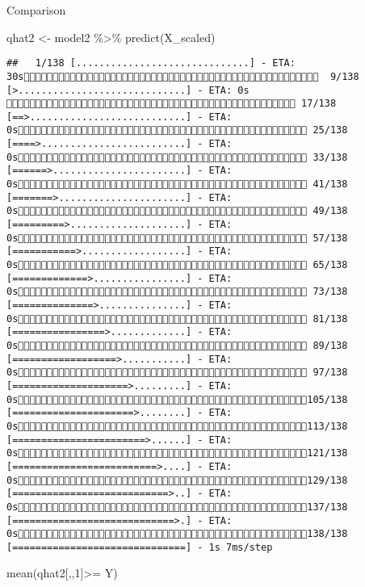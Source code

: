 \documentclass[
  ignorenonframetext,
]{beamer}
\newenvironment{Shaded}{\begin{snugshade}}{\end{snugshade}}
\newcommand{\DecValTok}[1]{\textcolor[rgb]{0.00,0.00,0.81}{#1}}
\newcommand{\FunctionTok}[1]{\textcolor[rgb]{0.00,0.00,0.00}{#1}}
\newcommand{\NormalTok}[1]{#1}
\newcommand{\OtherTok}[1]{\textcolor[rgb]{0.56,0.35,0.01}{#1}}
\newcommand{\SpecialCharTok}[1]{\textcolor[rgb]{0.00,0.00,0.00}{#1}}
\begin{document}
\begin{frame}[fragile]{Comparison}
\protect\hypertarget{comparison}{}
\begin{Shaded}
\begin{Highlighting}[]
\NormalTok{qhat2 }\OtherTok{\textless{}{-}}\NormalTok{ model2 }\SpecialCharTok{\%\textgreater{}\%} \FunctionTok{predict}\NormalTok{(X\_scaled)}
\end{Highlighting}
\end{Shaded}

\begin{verbatim}
##   1/138 [..............................] - ETA: 30s  9/138 [>.............................] - ETA: 0s  17/138 [==>...........................] - ETA: 0s 25/138 [====>.........................] - ETA: 0s 33/138 [======>.......................] - ETA: 0s 41/138 [=======>......................] - ETA: 0s 49/138 [=========>....................] - ETA: 0s 57/138 [===========>..................] - ETA: 0s 65/138 [=============>................] - ETA: 0s 73/138 [==============>...............] - ETA: 0s 81/138 [================>.............] - ETA: 0s 89/138 [==================>...........] - ETA: 0s 97/138 [====================>.........] - ETA: 0s105/138 [=====================>........] - ETA: 0s113/138 [=======================>......] - ETA: 0s121/138 [=========================>....] - ETA: 0s129/138 [===========================>..] - ETA: 0s137/138 [============================>.] - ETA: 0s138/138 [==============================] - 1s 7ms/step
\end{verbatim}

\begin{Shaded}
\begin{Highlighting}[]
\FunctionTok{mean}\NormalTok{(qhat2[,,}\DecValTok{1}\NormalTok{]}\SpecialCharTok{\textgreater{}=}\NormalTok{ Y)}
\end{Highlighting}
\end{Shaded}


\end{frame}
\end{document}
